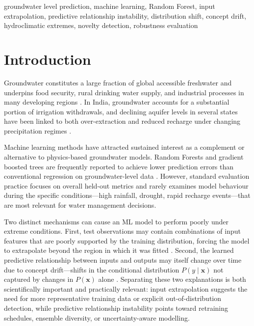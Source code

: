 \documentclass[conference]{IEEEtran}
\begin{document}
\begin{IEEEkeywords}
groundwater level prediction, machine learning, Random Forest, input
extrapolation, predictive relationship instability, distribution shift,
concept drift, hydroclimatic extremes, novelty detection, robustness
evaluation
\end{IEEEkeywords}

\section{Introduction}
\label{sec:intro}

Groundwater constitutes a large fraction of global accessible freshwater
and underpins food security, rural drinking water supply, and industrial
processes in many developing regions \cite{famiglietti2014groundwater}.
In India, groundwater accounts for a substantial portion of irrigation
withdrawals, and declining aquifer levels in several states have been
linked to both over-extraction and reduced recharge under changing
precipitation regimes \cite{rodell2009satellite}.

Machine learning methods have attracted sustained interest as a
complement or alternative to physics-based groundwater models.
Random Forests and gradient boosted trees are frequently reported to
achieve lower prediction errors than conventional regression on
groundwater-level data \cite{rajaee2019review, wunsch2021groundwater}.
However, standard evaluation practice focuses on overall held-out metrics
and rarely examines model behaviour during the specific conditions---high
rainfall, drought, rapid recharge events---that are most relevant for
water management decisions.

Two distinct mechanisms can cause an ML model to perform poorly under
extreme conditions.
First, test observations may contain combinations of input features that
are poorly supported by the training distribution, forcing the model to
extrapolate beyond the region in which it was fitted \cite{quionero2009dataset}.
Second, the learned predictive relationship between inputs and outputs may
itself change over time due to concept drift---shifts in the conditional
distribution $P(y \mid \mathbf{x})$ not captured by changes in
$P(\mathbf{x})$ alone \cite{gama2014survey}.
Separating these two explanations is both scientifically important and
practically relevant: input extrapolation suggests the need for more
representative training data or explicit out-of-distribution detection,
while predictive relationship instability points toward retraining
schedules, ensemble diversity, or uncertainty-aware modelling.
\end{document}
